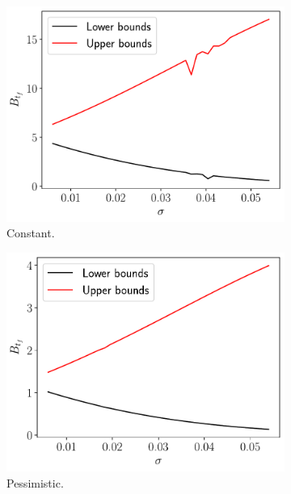 \documentclass[11pt]{article}
\theoremstyle{definition}
\theoremstyle{remark}
\theoremstyle{remark}
\begin{document}
\begin{figure}[H]
  \centering
  \begin{subfigure}[b]{0.45\textwidth}
      \centering
      \includegraphics[scale=0.45]{sens_constant.pdf}
      \caption{Constant.}
  \end{subfigure}
  \begin{subfigure}[b]{0.45\textwidth}
      \centering
      \includegraphics[scale=0.45]{sens_pessimistic.pdf}
      \caption{Pessimistic.}
  \end{subfigure}
  \begin{subfigure}[b]{0.45\textwidth}
      \centering

\end{subfigure}
\end{figure}
\end{document}

